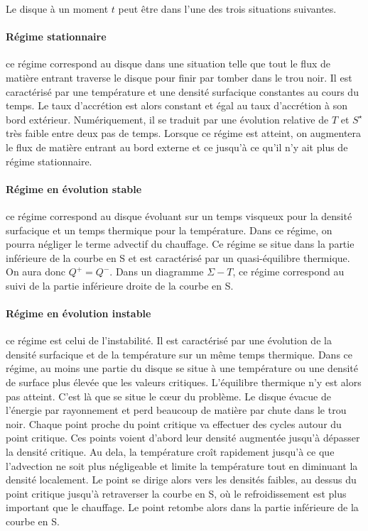 Le disque à un moment $t$ peut être dans l'une des trois situations suivantes.

\paragraph{Régime stationnaire} ce régime correspond au disque dans une
situation telle que tout le flux de matière entrant traverse le disque pour
finir par tomber dans le trou noir. Il est caractérisé par une température et
une densité surfacique constantes au cours du temps. Le taux d'accrétion est
alors constant et égal au taux d'accrétion à son bord extérieur. Numériquement,
il se traduit par une évolution relative de $T$ et $S^\star$ très faible entre
deux pas de temps. Lorsque ce régime est atteint, on augmentera le flux de
matière entrant au bord externe et ce jusqu'à ce qu'il n'y ait plus de régime
stationnaire.

\paragraph{Régime en évolution stable} ce régime correspond au disque évoluant
sur un temps visqueux pour la densité surfacique et un temps thermique pour la
température. Dans ce régime, on pourra négliger le terme advectif du chauffage.
Ce régime se situe dans la partie inférieure de la courbe en S et est
caractérisé par un quasi-équilibre thermique. On aura donc $Q^+ = Q^-$. Dans un
diagramme $\Sigma-T$, ce régime correspond au suivi de la partie inférieure
droite de la courbe en S. 

\paragraph{Régime en évolution instable} ce régime est celui de l'instabilité.
Il est caractérisé par une évolution de la densité surfacique et de la
température sur un même temps thermique. Dans ce régime, au moins une partie du
disque se situe à une température ou une densité de surface plus élevée que les
valeurs critiques. L'équilibre thermique n'y est alors pas atteint. C'est là
que se situe le cœur du problème. Le disque évacue de l'énergie par rayonnement
et perd beaucoup de matière par chute dans le trou noir. Chaque point proche du
point critique va effectuer des cycles autour du point critique. Ces points
voient d'abord leur densité augmentée jusqu'à dépasser la densité critique. Au
dela, la température croît rapidement jusqu'à ce que l'advection ne soit plus
négligeable et limite la température tout en diminuant la densité localement.
Le point se dirige alors vers les densités faibles, au dessus du point critique
jusqu'à retraverser la courbe en S, où le refroidissement est plus important
que le chauffage. Le point retombe alors dans la partie inférieure de la courbe
en S.

